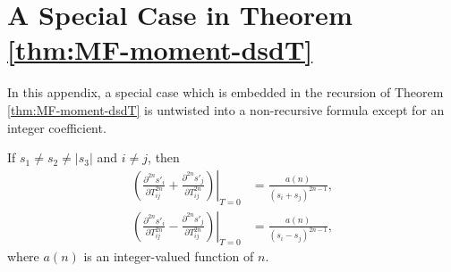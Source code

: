\appendix
\doublespacing

\chapter{A Special Case in Theorem \ref{thm:MF-moment-dsdT}} \label{app:MF-moment-specialRecursion}

In this appendix, a special case which is embedded in the recursion of Theorem \eqref{thm:MF-moment-dsdT} is untwisted into a non-recursive formula except for an integer coefficient.

\begin{theorem} \label{thm:MF-moment-specialRecursion}
	If $s_1 \neq s_2 \neq |s_3|$ and $i \neq j$, then
	\begin{align} \label{eqn:dsisjdT}
		\left.\left( \frac{\partial^{2n}s'_i}{\partial T_{ij}^{2n}} + \frac{\partial^{2n}s'_j}{\partial T_{ij}^{2n}} \right)\right|_{T=0} &= \frac{a(n)}{(s_i+s_j)^{2n-1}}, \nonumber \\
		\left.\left( \frac{\partial^{2n}s'_i}{\partial T_{ij}^{2n}} - \frac{\partial^{2n}s'_j}{\partial T_{ij}^{2n}} \right)\right|_{T=0} &= \frac{a(n)}{(s_i-s_j)^{2n-1}},
	\end{align}
	where $a(n)$ is an integer-valued function of $n$.
\end{theorem}


